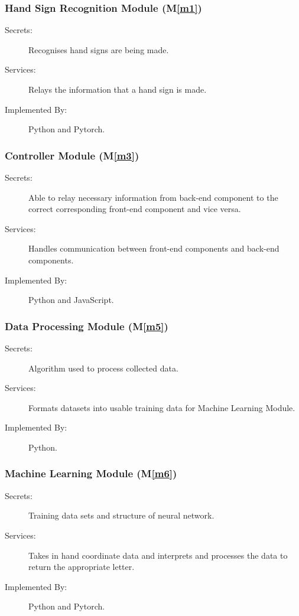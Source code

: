 \documentclass[12pt, titlepage]{article}
\newcommand{\mref}[1]{M\ref{#1}}
\begin{document}
\subsubsection{Hand Sign Recognition Module (\mref{m1})}
\begin{description}
\item[Secrets:] Recognises hand signs are being made.
\item[Services:] Relays the information that a hand sign is made.
\item[Implemented By:] Python and Pytorch.
\end{description}

\subsubsection{Controller Module (\mref{m3})}
\begin{description}
\item[Secrets:] Able to relay necessary information from back-end component to the correct corresponding front-end component and vice versa.
\item[Services:] Handles communication between front-end components and back-end components.
\item[Implemented By:] Python and JavaScript.
\end{description}

\subsubsection{Data Processing Module (\mref{m5})}
\begin{description}
\item[Secrets:] Algorithm used to process collected data.
\item[Services:] Formats datasets into usable training data for Machine Learning Module.
\item[Implemented By:] Python.
\end{description}

\subsubsection{Machine Learning Module (\mref{m6})}
\begin{description}
\item[Secrets:] Training data sets and structure of neural network.
\item[Services:] Takes in hand coordinate data and interprets and processes the data to return the appropriate letter.
\item[Implemented By:] Python and Pytorch.
\end{description}
\end{document}
